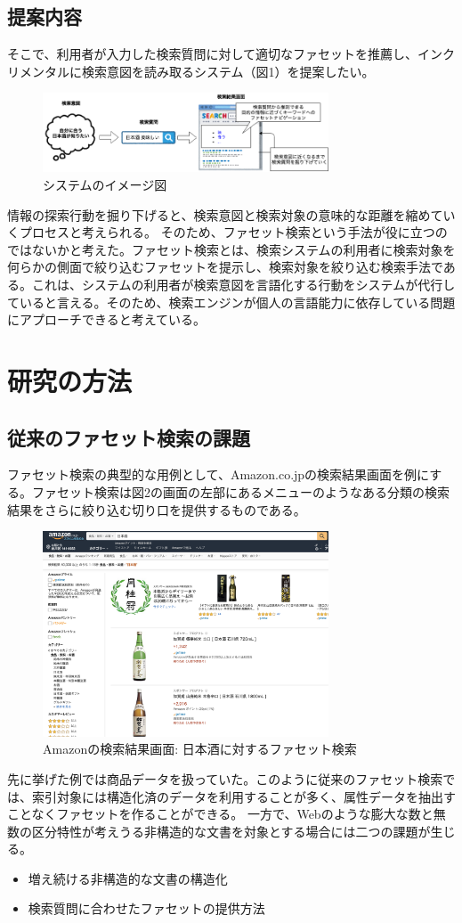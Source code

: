 \documentclass[a4j,10pt, twocolumn]{jarticle}
\begin{document}
\subsection{提案内容}

 そこで、利用者が入力した検索質問に対して適切なファセットを推薦し、インクリメンタルに検索意図を読み取るシステム（図1）を提案したい。

 \begin{figure}[h]
   \includegraphics[width=85mm]{./new_ir_with_navi.png}
   \caption{システムのイメージ図}
 \end{figure}
 
 情報の探索行動を掘り下げると、検索意図と検索対象の意味的な距離を縮めていくプロセスと考えられる。 そのため、ファセット検索という手法が役に立つのではないかと考えた。ファセット検索とは、検索システムの利用者に検索対象を何らかの側面で絞り込むファセットを提示し、検索対象を絞り込む検索手法である\cite{faceted}。これは、システムの利用者が検索意図を言語化する行動をシステムが代行していると言える。そのため、検索エンジンが個人の言語能力に依存している問題にアプローチできると考えている。
\section{研究の方法}
\subsection{従来のファセット検索の課題}
 ファセット検索の典型的な用例として、Amazon.co.jp\cite{amazon}の検索結果画面を例にする。ファセット検索は図2の画面の左部にあるメニューのようなある分類の検索結果をさらに絞り込む切り口を提供するものである。
 \begin{figure}[h]
   \includegraphics[width=85mm]{./amazon.png}
   \caption{Amazonの検索結果画面: 日本酒に対するファセット検索}
 \end{figure}
  先に挙げた例では商品データを扱っていた。このように従来のファセット検索では、索引対象には構造化済のデータを利用することが多く、属性データを抽出すことなくファセットを作ることができる。
  一方で、Webのような膨大な数と無数の区分特性が考えうる非構造的な文書を対象とする場合には二つの課題が生じる。
\begin{itemize}
  \item 増え続ける非構造的な文書の構造化
  \item 検索質問に合わせたファセットの提供方法
\end{itemize}
\end{document}
